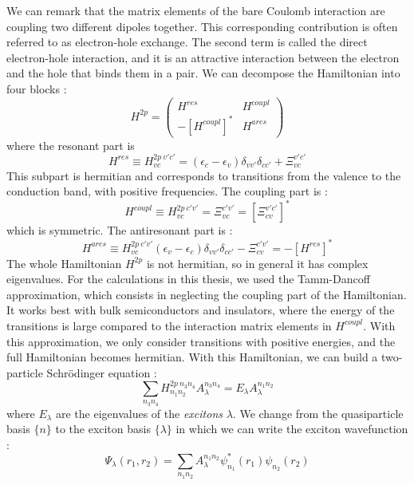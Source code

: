 We can remark that the matrix elements of the bare Coulomb interaction are coupling two different dipoles together. This corresponding contribution is often referred to as electron-hole exchange. The second term is called the direct electron-hole interaction, and it is an attractive interaction between the electron and the hole that binds them in a pair.
We can decompose the Hamiltonian into four blocks :
\begin{equation}
	H^{2p} = \begin{pmatrix}
		H^{res} & H^{coupl} \\
		-[H^{coupl}]^* & H^{ares}
	\end{pmatrix}
\end{equation}
where the resonant part is 
\begin{equation}
	H^{res} \equiv H^{2p\ v'c'}_{vc} = (\epsilon_c - \epsilon_v) \delta_{vv'}\delta_{cc'} + \Xi^{v'c'}_{vc}
\end{equation}
This subpart is hermitian and corresponds to transitions from the valence to the conduction band, with positive frequencies. The coupling part is :
\begin{equation}
	H^{coupl} \equiv H^{2p\ c'v'}_{vc} = \Xi^{c'v'}_{vc} = [\Xi^{v'c'}_{cv}]^*
\end{equation}
which is symmetric. The antiresonant part is :
\begin{equation}
	H^{ares} \equiv H^{2p\ c'v'}_{vc} (\epsilon_v - \epsilon_c)\delta_{vv'}\delta_{cc'} - \Xi^{c'v'}_{cv} = - [H^{res}]^*
\end{equation}
The whole Hamiltonian $H^{2p}$ is not hermitian, so in general it has complex eigenvalues. For the calculations in this thesis, we used the Tamm-Dancoff approximation, which consists in neglecting the coupling part of the Hamiltonian. It works best with bulk semiconductors and insulators, where the energy of the transitions is large compared to the interaction matrix elements in $H^{coupl}$. With this approximation, we only consider transitions with positive energies, and the full Hamiltonian becomes hermitian.
With this Hamiltonian, we can build a two-particle Schrödinger equation :
\begin{equation}
	\sum_{n_3n_4} H^{2p\ n_3n_4}_{n_1n_2} A_\lambda^{n_3n_4} = E_\lambda A_\lambda^{n_1n_2}
\end{equation}
where $E_\lambda$ are the eigenvalues of the \textit{excitons} $\lambda$. We change from the quasiparticle basis $\{n\}$ to the exciton basis $\{\lambda\}$ in which we can write the exciton wavefunction :
\begin{equation}
	\Psi_\lambda(r_1, r_2) = \sum_{n_1 n_2} A_\lambda^{n_1n_2} \psi_{n_1}^* (r_1) \psi_{n_2} (r_2)
\end{equation}
